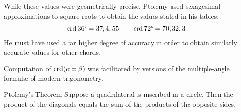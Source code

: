 While these values were geometrically precise, Ptolemy used sexagesimal approximations to square-roots to obtain the values stated in his tables:
\[
	\crd\ang{36} =37;4,55\qquad \crd\ang{72}=70;32,3
\]
He must have used a far higher degree of accuracy in order to obtain similarly accurate values for other chords.
\goodbreak



Computation of $\crd(\alpha\pm\beta)$ was facilitated by versions of the multiple-angle formulæ of modern trigonometry.

\begin{thm*}{Ptolemy's Theorem}{}
	Suppose a quadrilateral is inscribed in a circle. Then the product of the diagonals equals the sum of the products of the opposite sides.\footnotemark
\end{thm*}\label{pg:ptolemythm}


